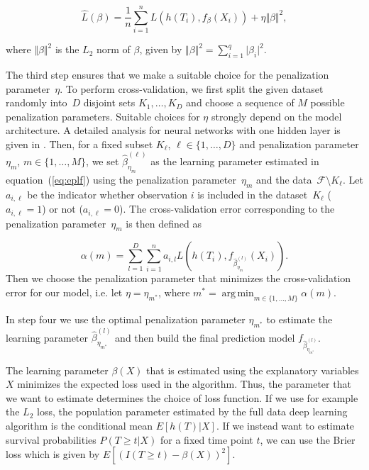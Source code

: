 \documentclass[12pt, a4paper]{scrartcl}
\theoremstyle{definition}
\theoremstyle{plain}
\numberwithin{equation}{section}
\numberwithin{figure}{section}
\numberwithin{table}{section}
\DeclareMathOperator*{\argmin}{arg\,min}
\begin{document}
	\begin{equation}\label{eq:eplf}
	\hat{L}(\beta) = \frac{1}{n} \sum_{i=1}^n L( h(T_i), f_{\beta}(X_i)) + \eta \Vert \beta \Vert ^2,
	\end{equation}
	
	where $\Vert \beta \Vert ^2$ is the $L_2$ norm of $\beta$, given by $\Vert \beta \Vert ^2 = \sum_{i=1}^q \vert \beta _i \vert ^2.$
	
	The third step ensures that we make a suitable choice for the penalization parameter~$\eta$.
	To perform cross-validation, we first split the given dataset randomly into~$D$ disjoint sets $K_1,\dots, K_D$ and choose a sequence of $M$ possible penalization parameters.
	Suitable choices for $\eta$ strongly depend on the model architecture.
	A detailed analysis for neural networks with one hidden layer is given in \citet*{regpar}. 
	Then, for a fixed subset $K_{\ell}$, $\ell \in \{1,\dots,D\}$ and penalization parameter $\eta_m$, $m \in \{1,\dots,M\}$, we set $\hat{\beta}_{\eta_{m}}^{(\ell)}$ as the learning parameter estimated in equation~(\ref{eq:eplf}) using the penalization parameter~$\eta_m$ and the data~$\mathcal{F} \setminus K_{\ell}$.
	Let $a_{i,\ell}$ be the indicator whether observation $i$ is included in the dataset~$K_\ell$ ($a_{i,\ell} = 1$) or not ($a_{i,\ell}=0$).
	The cross-validation error corresponding to the penalization parameter~$\eta_m$ is then defined as
	
	\begin{equation*}
	 \alpha(m) = \sum_{l=1}^D \sum_{i=1}^n a_{i,l} L(h(T_i), f_{\hat{\beta}_{\eta_m}^{(l)}}(X_i)).
 	\end{equation*}
 	Then we choose the penalization parameter that minimizes the cross-validation error for our model, i.e. let $\eta = \eta_{m^*}$, where $m^* = \argmin_{m \in \{1,\dots,M\}} \alpha(m)$.
 	
 	In step four we use the optimal penalization parameter $\eta_{m^*}$ to estimate the learning parameter $\hat{\beta}_{\eta_{m^*}}^{(l)}$ and then build the final prediction model $f_{\hat{\beta}_{\eta_{m^*}}^{(l)}}$.
 	
 	The learning parameter $\beta(X)$ that is estimated using the explanatory variables $X$ minimizes the expected loss used in the algorithm.
 	Thus, the parameter that we want to estimate determines the choice of loss function.
 	If we use for example the $L_2$ loss, the population parameter estimated by the full data deep learning algorithm is the conditional mean $E[h(T) \vert X]$.
 	If we instead want to estimate survival probabilities $P(T\geq t \vert X )$ for a fixed time point $t$, we can use the Brier loss which is given by $E[(I(T\geq t)-\beta(X))^2]$.
 	
\end{document}
